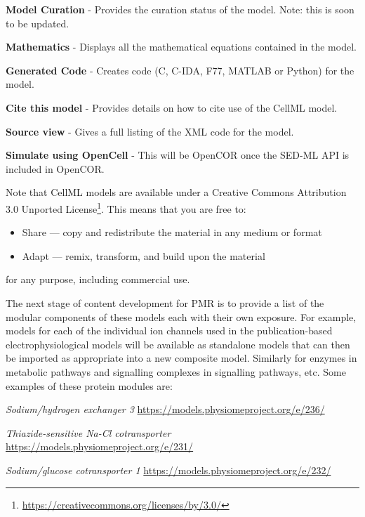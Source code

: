 \documentclass[a4paper,10pt,english]{sphinxmanual}
\begin{document}
\textbf{Model Curation} - Provides the curation status of the model. Note:
this is soon to be updated.

\textbf{Mathematics} - Displays all the mathematical equations contained in
the model.

\textbf{Generated Code} - Creates code (C, C-IDA, F77, MATLAB or Python) for
the model.

\textbf{Cite this model} - Provides details on how to cite use of the CellML
model.

\textbf{Source view} - Gives a full listing of the XML code for the model.

\textbf{Simulate using OpenCell} - This will be OpenCOR once the SED-ML API
is included in OpenCOR.

Note that CellML models are available under a Creative Commons
Attribution 3.0 Unported License\footnote[2]{
\href{https://creativecommons.org/licenses/by/3.0/}{https://creativecommons.org/licenses/by/3.0/}
}. This means that you are free to:
\begin{itemize}
\item {} 
Share — copy and redistribute the material in any medium or format

\item {} 
Adapt — remix, transform, and build upon the material

\end{itemize}

for any purpose, including commercial use.

The next stage of content development for PMR is to provide a list of
the modular components of these models each with their own exposure. For
example, models for each of the individual ion channels used in the
publication-based electrophysiological models will be available as
standalone models that can then be imported as appropriate into a new
composite model. Similarly for enzymes in metabolic pathways and
signalling complexes in signalling pathways, etc. Some examples of these
protein modules are:

\emph{Sodium/hydrogen exchanger 3} \href{https://models.physiomeproject.org/e/236/}{https://models.physiomeproject.org/e/236/}

\emph{Thiazide-sensitive Na-Cl cotransporter}
\href{https://models.physiomeproject.org/e/231/}{https://models.physiomeproject.org/e/231/}

\emph{Sodium/glucose cotransporter 1}
\href{https://models.physiomeproject.org/e/232/}{https://models.physiomeproject.org/e/232/}
\end{document}
